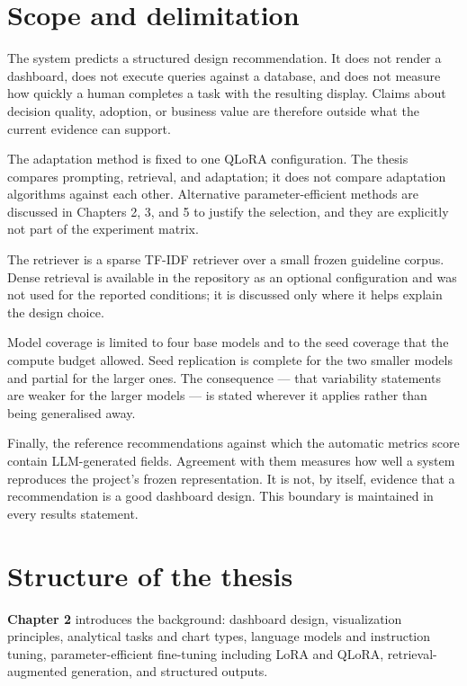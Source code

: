 \section{Scope and delimitation}

The system predicts a structured design recommendation. It does not render a dashboard, does not execute queries against a database, and does not measure how quickly a human completes a task with the resulting display. Claims about decision quality, adoption, or business value are therefore outside what the current evidence can support.

The adaptation method is fixed to one QLoRA configuration. The thesis compares prompting, retrieval, and adaptation; it does not compare adaptation algorithms against each other. Alternative parameter-efficient methods are discussed in Chapters 2, 3, and 5 to justify the selection, and they are explicitly not part of the experiment matrix.

The retriever is a sparse TF-IDF retriever over a small frozen guideline corpus. Dense retrieval is available in the repository as an optional configuration and was not used for the reported conditions; it is discussed only where it helps explain the design choice.

Model coverage is limited to four base models and to the seed coverage that the compute budget allowed. Seed replication is complete for the two smaller models and partial for the larger ones. The consequence --- that variability statements are weaker for the larger models --- is stated wherever it applies rather than being generalised away.

Finally, the reference recommendations against which the automatic metrics score contain LLM-generated fields. Agreement with them measures how well a system reproduces the project's frozen representation. It is not, by itself, evidence that a recommendation is a good dashboard design. This boundary is maintained in every results statement.

\section{Structure of the thesis}

\textbf{Chapter 2} introduces the background: dashboard design, visualization principles, analytical tasks and chart types, language models and instruction tuning, parameter-efficient fine-tuning including LoRA and QLoRA, retrieval-augmented generation, and structured outputs.

